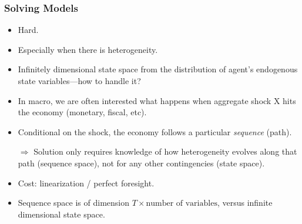 \documentclass[english,xcolor=svgnames]{beamer}
\begin{document}
\begin{frame}
    \frametitle{Solving Models}
    \begin{itemize}
        \item Hard.
        \item Especially when there is heterogeneity.
        \item Infinitely dimensional state space from the distribution of agent's endogenous state variables---how to handle it?
        \item In macro, we are often interested what happens when aggregate shock X hits the economy (monetary, fiscal, etc).
        \item Conditional on the shock, the economy follows a particular \emph{sequence} (path).
        \item[$\Rightarrow$] Solution only requires knowledge of how heterogeneity evolves along that path (sequence space), not for any other contingencies (state space). 
       	\item Cost: linearization / perfect foresight.
       	\item Sequence space is of dimension $T \times \text{number of variables}$, versus infinite dimensional state space.
    \end{itemize}
\end{frame}
\end{document}
